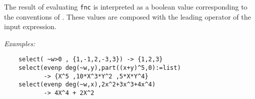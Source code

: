 The result of evaluating \texttt{fnc} is
interpreted as a boolean value corresponding to the conventions of
\REDUCE. These values are composed with the leading operator of the
input expression.

\textit{Examples:}\nopagebreak
\begin{verbatim}
    select( ~w>0 , {1,-1,2,-3,3}) -> {1,2,3}
    select(evenp deg(~w,y),part((x+y)^5,0):=list)
           -> {X^5 ,10*X^3*Y^2 ,5*X*Y^4}
    select(evenp deg(~w,x),2x^2+3x^3+4x^4)
           -> 4X^4 + 2X^2
\end{verbatim}
